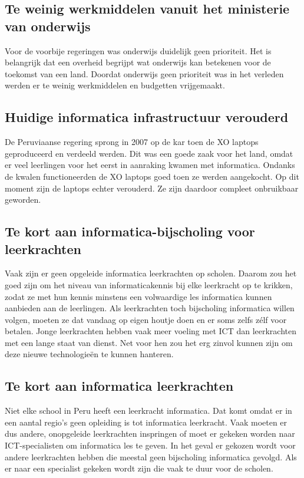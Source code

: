 \subsection{Te weinig werkmiddelen vanuit het ministerie van onderwijs}
Voor de voorbije regeringen was onderwijs duidelijk geen prioriteit. Het is belangrijk dat een overheid begrijpt wat onderwijs kan betekenen voor de toekomst van een land. Doordat onderwijs geen prioriteit was in het verleden werden er te weinig werkmiddelen en budgetten vrijgemaakt.

\subsection{Huidige informatica infrastructuur verouderd}
De Peruviaanse regering sprong in 2007 op de kar toen de XO laptops geproduceerd en verdeeld werden. Dit was een goede zaak voor het land, omdat er veel leerlingen voor het eerst in aanraking kwamen met informatica. Ondanks de kwalen functioneerden de XO laptops goed toen ze werden aangekocht. Op dit moment zijn de laptops echter verouderd. Ze zijn daardoor compleet onbruikbaar geworden.

\subsection{Te kort aan informatica-bijscholing voor leerkrachten}
Vaak zijn er geen opgeleide informatica leerkrachten op scholen. Daarom zou het goed zijn om het niveau van informaticakennis bij elke leerkracht op te krikken, zodat ze met hun kennis minstens een volwaardige les informatica kunnen 	aanbieden aan de leerlingen. Als leerkrachten toch bijscholing informatica willen volgen, moeten ze dat vandaag op eigen houtje doen en er soms zelfs zélf voor betalen. Jonge leerkrachten hebben vaak meer voeling met ICT dan leerkrachten met een lange staat van dienst. Net voor hen zou het erg zinvol kunnen zijn om deze nieuwe technologieën te kunnen hanteren. 

\subsection{Te kort aan informatica leerkrachten}
Niet elke school in Peru heeft een leerkracht informatica. Dat komt omdat er in een aantal regio's geen opleiding is tot informatica leerkracht. Vaak moeten er dus andere, onopgeleide leerkrachten inspringen of moet er gekeken worden naar ICT-specialisten om informatica les te geven. In het geval er gekozen wordt voor andere leerkrachten hebben die meestal geen bijscholing informatica gevolgd. Als er naar een specialist gekeken wordt zijn die vaak te duur voor de scholen. 

